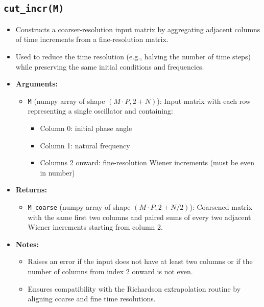 \documentclass{article}
\begin{document}
\subsection{\texttt{cut\_incr(M)}}
\begin{itemize}
    \item Constructs a coarser-resolution input matrix by aggregating adjacent columns of time increments from a fine-resolution matrix.
    \item Used to reduce the time resolution (e.g., halving the number of time steps) while preserving the same initial conditions and frequencies.

    \item \textbf{Arguments:}
    \begin{itemize}
        \item \texttt{M} (numpy array of shape $(M \cdot P, 2 + N)$): Input matrix with each row representing a single oscillator and containing:
        \begin{itemize}
            \item Column 0: initial phase angle
            \item Column 1: natural frequency
            \item Columns 2 onward: fine-resolution Wiener increments (must be even in number)
        \end{itemize}
    \end{itemize}

    \item \textbf{Returns:}
    \begin{itemize}
        \item \texttt{M\_coarse} (numpy array of shape $(M \cdot P, 2 + N/2)$): Coarsened matrix with the same first two columns and paired sums of every two adjacent Wiener increments starting from column 2.
    \end{itemize}

    \item \textbf{Notes:}
    \begin{itemize}
        \item Raises an error if the input does not have at least two columns or if the number of columns from index 2 onward is not even.
        \item Ensures compatibility with the Richardson extrapolation routine by aligning coarse and fine time resolutions.
    \end{itemize}
\end{itemize}
\end{document}
